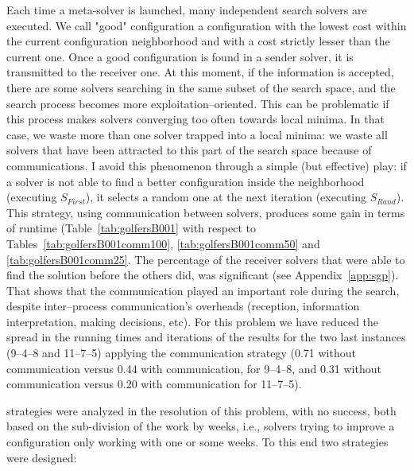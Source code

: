 Each time a \posl{} meta-solver is launched, many independent search solvers are executed. We call "good" configuration a configuration with the lowest cost within the current configuration neighborhood and with a cost strictly lesser than the current one. Once a good configuration is found in a sender solver, it is transmitted to the receiver one. At this moment, if the information is accepted, there are some solvers searching in the same subset of the search space, and the search process becomes more exploitation--oriented. This can be problematic if this process makes solvers converging too often towards local minima. In that case, we waste more than one solver trapped into a local minima: we waste all solvers that have been attracted to this part of the search space because of communications. I avoid this phenomenon through a simple (but effective) play: if a solver is not able to find a better configuration inside the neighborhood (executing $S_{First}$), it selects a random one at the next iteration (executing $S_{Rand}$). This strategy, using communication between solvers, produces some gain in terms of runtime (Table~\ref{tab:golfersB001} with respect to Tables~\ref{tab:golfersB001comm100}, \ref{tab:golfersB001comm50} and \ref{tab:golfersB001comm25}. The percentage of the receiver solvers that were able to find the solution before the others did, was significant (see Appendix~\ref{app:sgp}).
That shows that the communication played an important role during the search, despite inter--process communication's overheads (reception, information interpretation, making decisions, etc). 
For this problem we have reduced the spread in the running times and iterations of the results for the two last instances (9--4--8 and 11--7--5) applying the communication strategy (0.71 without communication versus 0.44 with communication, for 9--4--8, and 0.31 without communication versus 0.20 with communication for 11--7--5).

 strategies were analyzed in the resolution of this problem, with no success, both based on the sub-division of the work by weeks, i.e., solvers trying to improve a configuration only working with one or some weeks. To this end two strategies were designed:

